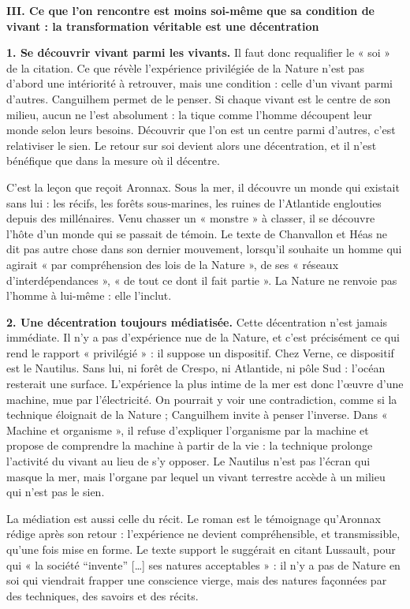 \documentclass[11pt,a4paper]{article}
\begin{document}
\textbf{III. Ce que l'on rencontre est moins soi-même que sa condition de vivant : la transformation véritable est une décentration}

\textbf{1. Se découvrir vivant parmi les vivants.} Il faut donc requalifier le « soi » de la citation. Ce que révèle l'expérience privilégiée de la Nature n'est pas d'abord une intériorité à retrouver, mais une condition : celle d'un vivant parmi d'autres. Canguilhem permet de le penser. Si chaque vivant est le centre de son milieu, aucun ne l'est absolument : la tique comme l'homme découpent leur monde selon leurs besoins. Découvrir que l'on est un centre parmi d'autres, c'est relativiser le sien. Le retour sur soi devient alors une décentration, et il n'est bénéfique que dans la mesure où il décentre.

C'est la leçon que reçoit Aronnax. Sous la mer, il découvre un monde qui existait sans lui : les récifs, les forêts sous-marines, les ruines de l'Atlantide englouties depuis des millénaires. Venu chasser un « monstre » à classer, il se découvre l'hôte d'un monde qui se passait de témoin. Le texte de Chanvallon et Héas ne dit pas autre chose dans son dernier mouvement, lorsqu'il souhaite un homme qui agirait « par compréhension des lois de la Nature », de ses « réseaux d'interdépendances », « de tout ce dont il fait partie ». La Nature ne renvoie pas l'homme à lui-même : elle l'inclut.

\textbf{2. Une décentration toujours médiatisée.} Cette décentration n'est jamais immédiate. Il n'y a pas d'expérience nue de la Nature, et c'est précisément ce qui rend le rapport « privilégié » : il suppose un dispositif. Chez Verne, ce dispositif est le Nautilus. Sans lui, ni forêt de Crespo, ni Atlantide, ni pôle Sud : l'océan resterait une surface. L'expérience la plus intime de la mer est donc l'œuvre d'une machine, mue par l'électricité. On pourrait y voir une contradiction, comme si la technique éloignait de la Nature ; Canguilhem invite à penser l'inverse. Dans « Machine et organisme », il refuse d'expliquer l'organisme par la machine et propose de comprendre la machine à partir de la vie : la technique prolonge l'activité du vivant au lieu de s'y opposer. Le Nautilus n'est pas l'écran qui masque la mer, mais l'organe par lequel un vivant terrestre accède à un milieu qui n'est pas le sien.

La médiation est aussi celle du récit. Le roman est le témoignage qu'Aronnax rédige après son retour : l'expérience ne devient compréhensible, et transmissible, qu'une fois mise en forme. Le texte support le suggérait en citant Lussault, pour qui « la société ``invente'' {[}\ldots{]} ses natures acceptables » : il n'y a pas de Nature en soi qui viendrait frapper une conscience vierge, mais des natures façonnées par des techniques, des savoirs et des récits.
\end{document}
